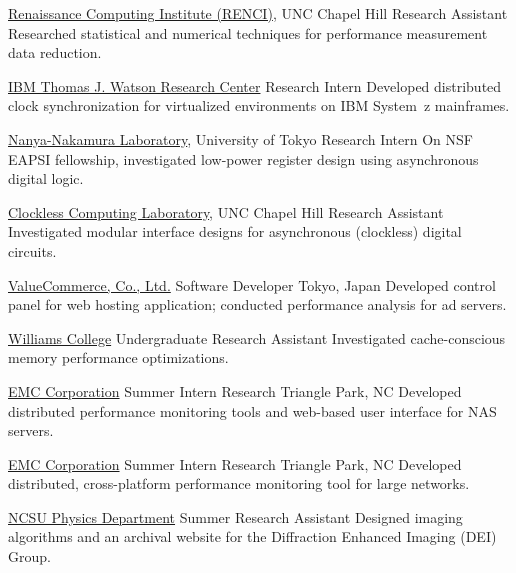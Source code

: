 		{\href{http://www.renci.org}{Renaissance Computing Institute (RENCI)}, UNC Chapel Hill}
		{Research Assistant}
		{}{}
		{Researched statistical and numerical techniques for performance measurement data reduction.}

		{\href{http://www.watson.ibm.com}{IBM Thomas J. Watson Research Center}}
		{Research Intern}
		{}{}
		{Developed distributed clock synchronization for virtualized environments on IBM System~z mainframes.}

		{\href{http://www.hal.rcast.u-tokyo.ac.jp/}{Nanya-Nakamura Laboratory}, University of Tokyo}
		{Research Intern}
		{}{}
		{On NSF EAPSI fellowship, investigated low-power register design using asynchronous digital logic.}

		{\href{http://www.cs.unc.edu/~montek/}{Clockless Computing Laboratory}, UNC Chapel Hill}
		{Research Assistant}
		{}{}
		{Investigated modular interface designs for asynchronous (clockless) digital circuits.}

		{\href{http://valuecommerce.com}{ValueCommerce, Co., Ltd.}}
		{Software Developer}
		{Tokyo, Japan}{}
		{Developed control panel for web hosting application; conducted
		 performance analysis for ad servers.}

		{\href{http://www.williams.edu}{Williams College}}
		{Undergraduate Research Assistant}
		{}{}
		{Investigated cache-conscious memory performance optimizations.}

		{\href{http://www.emc.com}{EMC Corporation}}
		{Summer Intern}
		{Research Triangle Park, NC}{}
		{Developed distributed performance monitoring tools and
		 web-based user interface for NAS servers.}

		{\href{http://www.emc.com}{EMC Corporation}}
		{Summer Intern}
		{Research Triangle Park, NC}{}
		{Developed distributed, cross-platform performance monitoring tool
		 for large networks.}

		{\href{http://physics.ncsu.edu/}{NCSU Physics Department}}
		{Summer Research Assistant}
		{}{}
		{Designed imaging algorithms and an archival website for the Diffraction
		 Enhanced Imaging (DEI) Group.}
